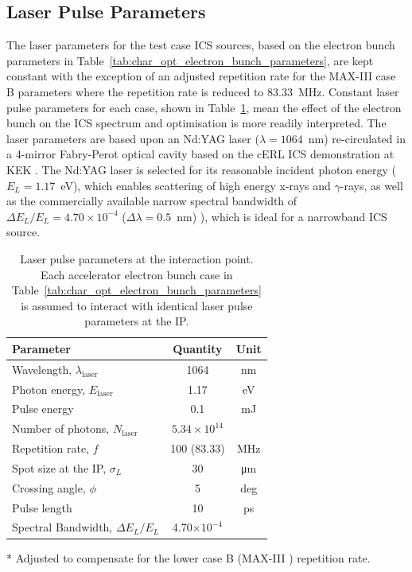\documentclass[../main.tex]{subfiles}
\begin{document}
\subsection{Laser Pulse Parameters}

The laser parameters for the test case ICS sources, based on the electron bunch parameters in Table~\ref{tab:char_opt_electron_bunch_parameters}, are kept constant with the exception of an adjusted repetition rate for the MAX-III case B parameters where the repetition rate is reduced to 83.33~\si{\mega\hertz}. Constant laser pulse parameters for each case, shown in Table~\ref{tab:char_opt_laser_pulse_parameters}, mean the effect of the electron bunch on the ICS spectrum and optimisation is more readily interpreted. The laser parameters are based upon an Nd:YAG laser ($\lambda = 1064$~\si{\nano\meter}) re-circulated in a 4-mirror Fabry-Perot optical cavity based on the cERL ICS demonstration at KEK \cite{akagi2016narrow}. The Nd:YAG laser is selected for its reasonable incident photon energy ($E_{L}=1.17$~\si{\electronvolt}), which enables scattering of high energy x-rays and $\gamma$-rays, as well as the commercially available narrow spectral bandwidth of $\Delta E_{L}/E_{L} = 4.70\times 10^{-4}$  ($\Delta\lambda = 0.5$~\si{\nano\meter}) \cite{thorlabs2021ndyag200}), which is ideal for a narrowband ICS source.

\begin{table}[!h]
\centering
\caption{Laser pulse parameters at the interaction point. Each accelerator electron bunch case in Table~\ref{tab:char_opt_electron_bunch_parameters} is assumed to interact with identical laser pulse parameters at the IP.}
\vspace{3mm}
\begin{threeparttable}
\begin{tabular}{lcc}
\hline\hline
Parameter & Quantity & Unit \\
\hline
Wavelength, $\lambda_\textrm{laser}$ & 1064 & nm\\
Photon energy, $E_\textrm{laser}$ & 1.17 & eV\\
Pulse energy  & 0.1 & \si{\milli\joule}\\
Number of photons, $N_{\textrm{laser}}$ & $5.34\times 10^{14}$\\ 
Repetition rate, $f$ & 100 (83.33)\tnote{*} & MHz\\
Spot size at the IP, $\sigma_{L}$ & 30 & \si{\micro\meter}\\
Crossing angle, $\phi$ & 5 & deg \\
Pulse length  & 10 & ps\\
Spectral Bandwidth, $\Delta E_{L}/E_{L}$ & 4.70$\times 10^{-4}$ &   \\
\hline\hline
\end{tabular}
\begin{tablenotes}
\item[*]{Adjusted to compensate for the lower case B (MAX-III \cite{sjostrom2009max,rosborg2012electron}) repetition rate.}
\end{tablenotes}
\end{threeparttable}
\label{tab:char_opt_laser_pulse_parameters}
\end{table}
\end{document}
